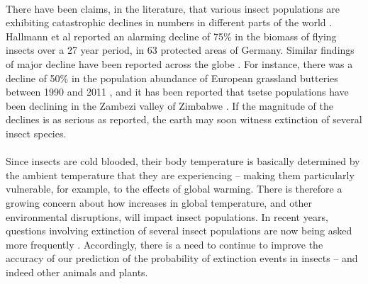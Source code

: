 \documentclass[smallextended]{svjour3}
\newcommand{\comment}[3]{\textcolor{#1}{\textbf{[#2: }\textit{#3}\textbf{]}}}
\newcommand{\jd}[1]{\comment{cyan}{JD}{#1}}
\newcommand{\eb}[1]{\comment{blue}{EB}{#1}}
\begin{document}
\paragraph{}


There have been claims, in the literature, that various insect populations are exhibiting catastrophic declines in numbers in different parts of the world \cite{Conrad2002,Potts2010,Ilyinykh2011,VanSwaay2013,Lister2018}. Hallmann et al \cite{Hallmann2017} reported an alarming decline of 75\% in the biomass of flying insects over a 27 year period, in 63 protected areas of Germany. Similar findings of major decline have been reported across the globe \cite{Habel2015,Pelton2019}. For instance, there was a decline of 50\% in the population abundance of European grassland butteries between 1990 and 2011 \cite{VanSwaay2013}, and it has been reported that tsetse populations have been declining in the Zambezi valley of Zimbabwe \cite{Lord2018}. If the magnitude of the declines is as serious as reported, the earth may soon witness extinction of several insect species. 

\paragraph{}
Since insects are cold blooded, their body temperature is basically determined by the ambient temperature that they are experiencing – making them particularly vulnerable, for example, to the effects of global warming. There is therefore a growing concern about how increases in global temperature, and other environmental disruptions, will impact insect populations. In recent years, questions involving extinction of several insect populations are now being asked more frequently \cite{Nilsson2017}. Accordingly, there is a need to continue to improve the accuracy of our prediction of the probability of extinction events in insects – and indeed other animals and plants. 
\end{document}

